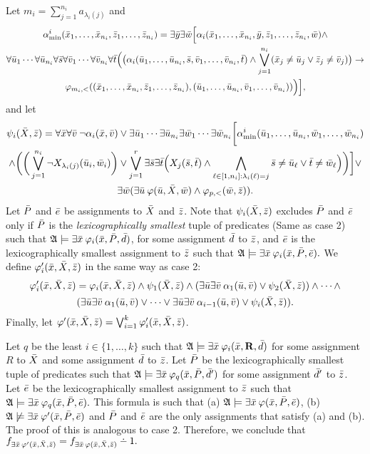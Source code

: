\begin{enumerate}
	Let $m_i = \sum_{j = 1}^{n_i} a_{\lambda_i(j)}$ and
	\begin{multline*}
	\alpha^i_{\min}(\x_1,\dots,\x_{n_i},\z_1,\dots,\z_{n_i}) = \exists\y\exists\w\Big[ \alpha_i(\x_1,\dots,\x_{n_i},\y,\z_1,\dots,\z_{n_i},\w)\wedge \\ \forall\u_1\cdots\forall\u_{n_i}\forall\s\forall\v_1\cdots\forall\v_{n_i}\forall\t\Big(\big(\alpha_i(\u_1,\dots,\u_{n_i},\s,\v_1,\dots,\v_{n_i},\t)\wedge\bigvee_{j=1}^{n_i}(\x_j\neq\u_j \vee \z_j\neq\v_j)\big)\to \\ \varphi_{m_i,<}((\x_1,\dots,\x_{n_i},\z_1,\dots,\z_{n_i}),(\u_1,\dots,\u_{n_i},\v_1,\dots,\v_{n_i}))\Big)\Big],
	\end{multline*}
	and let
	\begin{multline*}
	\psi_i(\X,\z) = \forall\x\forall\v\:\neg\alpha_i(\x,\v) \vee \exists\u_1\cdots\exists\u_{n_i}\exists\w_1\cdots\exists\w_{n_i}\bigg[\alpha^i_{\min}(\u_1,\dots,\u_{n_i},\w_1,\dots,\w_{n_i}) \\ \wedge \bigg(\bigg(\bigvee_{j = 1}^{n_i}\neg X_{\lambda_i(j)}(\u_i,\w_i) \bigg) \vee \bigvee_{j=1}^r \exists \s\exists \t\Big( X_j(\s,\t) \wedge \bigwedge_{\ell\in[1,n_i]: \lambda_i(\ell) = j} \s \neq \u_\ell \vee \t \neq \w_\ell\Big) \bigg) \bigg] \vee \\ \exists\w(\exists\u\:\varphi(\u,\X,\w) \wedge \varphi_{p,<}(\w,\z)).
	\end{multline*}
	Let $\P$ and $\e$ be assignments to $\X$ and $\z$. Note that $\psi_i(\X,\z)$ excludes $\P$ and $\e$ only if $\P$ is the {\em lexicographically smallest} tuple of predicates (Same as case 2) such that $\A\models\exists\x\:\varphi_i(\x,\P,\d)$, for some assignment $\d$ to $\z$, and $\e$ is the lexicographically smallest assignment to $\z$ such that $\A\models\exists\x\:\varphi_i(\x,\P,\e).$ We define $\varphi_i^\prime(\x,\X,\z)$ in the same way as case 2:
	\begin{multline*}
	\varphi_i^\prime(\x,\X,\z) = \varphi_i(\x,\X,\z) \wedge \psi_1(\X,\z) \wedge (\exists\u\exists\v\:\alpha_1(\u,\v)\vee\psi_2(\X,\z)) \wedge \cdots \wedge \\ (\exists\u\exists\v\:\alpha_1(\u,\v)\vee\cdots\vee\exists\u\exists\v\:\alpha_{i-1}(\u,\v)\vee\psi_i(\X,\z)).
	\end{multline*}
	Finally, let $\varphi^\prime(\x,\X,\z) = \bigvee_{i = 1}^k \varphi_i^\prime(\x,\X,\z)$.
	
	Let $q$ be the least $i\in\{1,\ldots,k\}$ such that $\A\models\exists\x\:\varphi_i(\x,\R,\d)$ for some assignment $R$ to $\X$ and some assignment $\d$ to $\z$. Let $\P$ be the lexicographically smallest tuple of predicates such that $\A\models\exists\x\:\varphi_q(\x,\P,\d^\prime)$ for some assignment $\d^\prime$ to $\z$. Let $\e$ be the lexicographically smallest assignment to $\z$ such that $\A\models\exists\x\:\varphi_q(\x,\P,\e).$ This formula is such that (a) $\A\models\exists\x\:\varphi(\x,\P,\e)$, (b) $\A\not\models\exists\x\:\varphi^\prime(\x,\P,\e)$ and $\P$ and $\e$ are the only assignments that satisfy (a) and (b). The proof of this is analogous to case 2. Therefore, we conclude that $f_{\exists\x\,\varphi^\prime(\x,\X,\z)} = f_{\exists\x\,\varphi(\x,\X,\z)}\dotminus 1.$
\end{enumerate}
		

